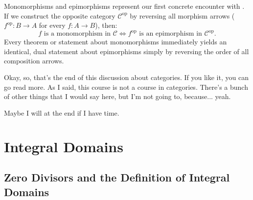 \begin{insight}
Monomorphisms and epimorphisms represent our first concrete encounter with . If we construct the opposite category $\mathcal{C}^{\text{op}}$ by reversing all morphism arrows ($f^{\text{op}} \colon B \to A$ for every $f \colon A \to B$), then:
\[
f \text{ is a monomorphism in } \mathcal{C} \iff f^{\text{op}} \text{ is an epimorphism in } \mathcal{C}^{\text{op}}.
\]
Every theorem or statement about monomorphisms immediately yields an identical, dual statement about epimorphisms simply by reversing the order of all composition arrows.
\end{insight}

\begin{speech}[00:10:37 - 00:11:03]
Okay, so, that's the end of this discussion about categories. If you like it, you can go read more. As I said, this course is not a course in categories. There's a bunch of other things that I would say here, but I'm not going to, because... yeah.

Maybe I will at the end if I have time.
\end{speech}

\begin{hidden}
\end{hidden}

\section{Integral Domains}

\subsection{Zero Divisors and the Definition of Integral Domains}

